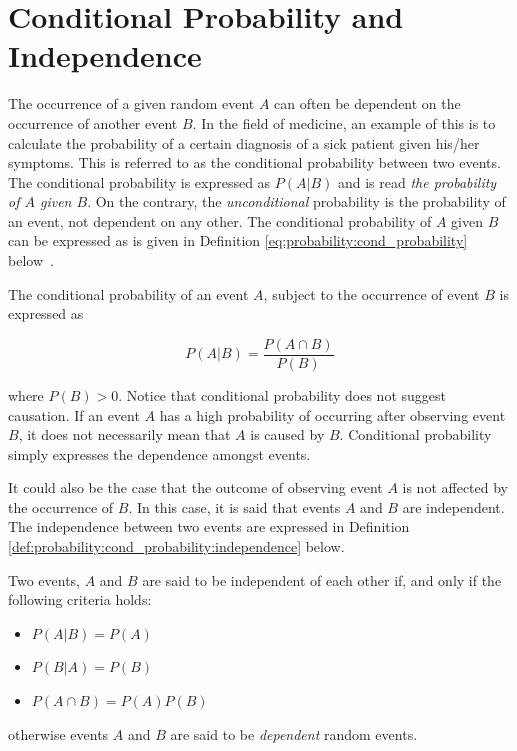 \section{Conditional Probability and Independence}
\label{sec:probability:cond_probability}

The occurrence of a given random event $A$ can often be dependent on the occurrence of another event $B$. In the field of medicine, an example of this is to calculate the probability of a certain diagnosis of a sick patient given his/her symptoms. This is referred to as the conditional probability between two events. The conditional probability is expressed as $P(A \vert B)$ and is read \textit{the probability of $A$ given $B$}. On the contrary, the \textit{unconditional} probability is the probability of an event, not dependent on any other. The conditional probability of $A$ given $B$ can be expressed as is given in Definition \ref{eq:probability:cond_probability} below~\cite{ref:wackerly:2014}.

\begin{definition}
      \label{eq:probability:cond_probability}
      The conditional probability of an event $A$, subject to the occurrence of event $B$ is expressed as

      \begin{equation*}
            P(A \vert B) = \frac{P(A \cap B)}{P(B)}
      \end{equation*}
\end{definition}

where $P(B) > 0$. Notice that conditional probability does not suggest causation. If an event $A$ has a high probability of occurring after observing event $B$, it does not necessarily mean that $A$ is caused by $B$. Conditional probability simply expresses the dependence amongst events.

It could also be the case that the outcome of observing event $A$ is not affected by the occurrence of $B$. In this case, it is said that events $A$ and $B$ are independent. The independence between two events are expressed in Definition \ref{def:probability:cond_probability:independence} below.

\begin{definition}
      \label{def:probability:cond_probability:independence}
      Two events, $A$ and $B$ are said to be independent of each other if, and only if the following criteria holds:

      \begin{itemize}
            \item $P(A \vert B) = P(A)$
            \item $P(B \vert A) = P(B)$
            \item $P(A \cap B) = P(A)P(B)$
      \end{itemize}

      otherwise events $A$ and $B$ are said to be \textit{dependent} random events.
\end{definition}

